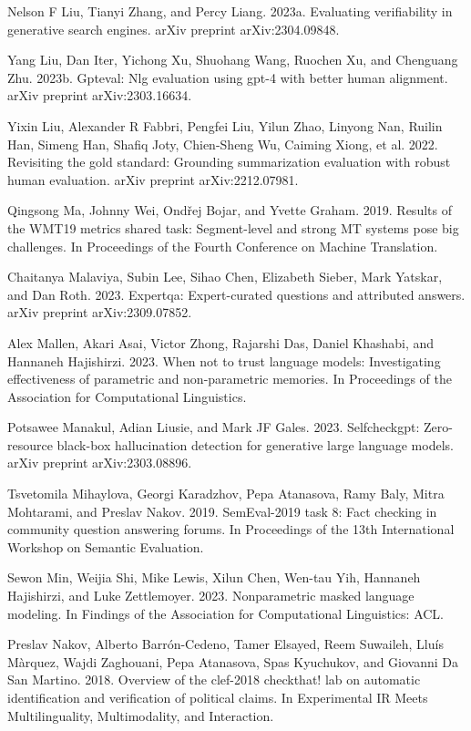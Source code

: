 \documentclass[11pt,UTF8,fontset=fandol]{ctexart}
\begin{document}
Nelson F Liu, Tianyi Zhang, and Percy Liang. 2023a. Evaluating verifiability in generative search engines. arXiv preprint arXiv:2304.09848.

Yang Liu, Dan Iter, Yichong Xu, Shuohang Wang, Ruochen Xu, and Chenguang Zhu. 2023b. Gpteval: Nlg evaluation using gpt-4 with better human alignment. arXiv preprint arXiv:2303.16634.

Yixin Liu, Alexander R Fabbri, Pengfei Liu, Yilun Zhao, Linyong Nan, Ruilin Han, Simeng Han, Shafiq Joty, Chien-Sheng Wu, Caiming Xiong, et al. 2022. Revisiting the gold standard: Grounding summarization evaluation with robust human evaluation. arXiv preprint arXiv:2212.07981.

Qingsong Ma, Johnny Wei, Ondřej Bojar, and Yvette Graham. 2019. Results of the WMT19 metrics shared task: Segment-level and strong MT systems pose big challenges. In Proceedings of the Fourth Conference on Machine Translation.

Chaitanya Malaviya, Subin Lee, Sihao Chen, Elizabeth Sieber, Mark Yatskar, and Dan Roth. 2023. Expertqa: Expert-curated questions and attributed answers. arXiv preprint arXiv:2309.07852.

Alex Mallen, Akari Asai, Victor Zhong, Rajarshi Das, Daniel Khashabi, and Hannaneh Hajishirzi. 2023. When not to trust language models: Investigating effectiveness of parametric and non-parametric memories. In Proceedings of the Association for Computational Linguistics.

Potsawee Manakul, Adian Liusie, and Mark JF Gales. 2023. Selfcheckgpt: Zero-resource black-box hallucination detection for generative large language models. arXiv preprint arXiv:2303.08896.

Tsvetomila Mihaylova, Georgi Karadzhov, Pepa Atanasova, Ramy Baly, Mitra Mohtarami, and Preslav Nakov. 2019. SemEval-2019 task 8: Fact checking in community question answering forums. In Proceedings of the 13th International Workshop on Semantic Evaluation.

Sewon Min, Weijia Shi, Mike Lewis, Xilun Chen, Wen-tau Yih, Hannaneh Hajishirzi, and Luke Zettlemoyer. 2023. Nonparametric masked language modeling. In Findings of the Association for Computational Linguistics: ACL.

Preslav Nakov, Alberto Barrón-Cedeno, Tamer Elsayed, Reem Suwaileh, Lluís Màrquez, Wajdi Zaghouani, Pepa Atanasova, Spas Kyuchukov, and Giovanni Da San Martino. 2018. Overview of the clef-2018 checkthat! lab on automatic identification and verification of political claims. In Experimental IR Meets Multilinguality, Multimodality, and Interaction.
\end{document}
